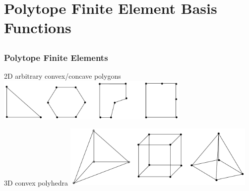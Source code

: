 \documentclass[compress,10pt]{beamer}
\begin{document}
\begin{frame}[t]
{}
\end{frame}
%
%
\section[POLYFEM]{Polytope Finite Element Basis Functions}
\subsection{}
\begin{frame}[t]\frametitle{Polytope Finite Elements}
\centering
\begin{block}{2D arbitrary convex/concave polygons}
\centering
\includegraphics[width=0.70\textwidth]{images/arbitrary_polygons.png}
\end{block}
\vspace{0.5cm}
\begin{block}{3D convex polyhedra}
\centering
\includegraphics[width=0.70\textwidth]{images/arbitrary_polyhedra.png}
\end{block}
\end{frame}
\end{document}
